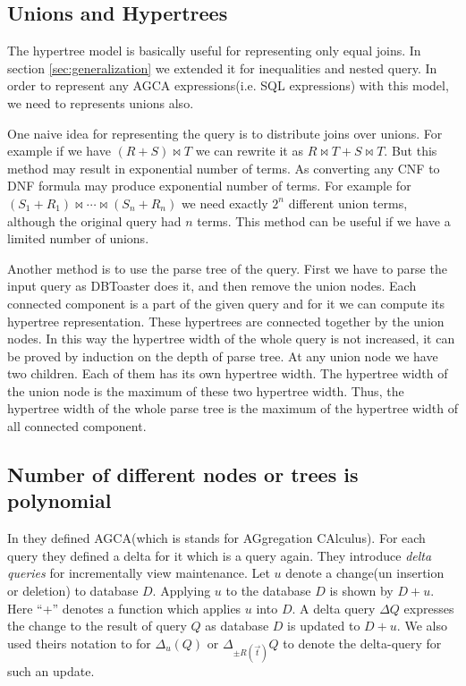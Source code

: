 \documentclass[12pt]{article}
\begin{document}
\subsection{Unions and Hypertrees}
The hypertree model is basically useful for representing only equal joins. In section \ref{sec:generalization} we extended it for inequalities and nested query. In order to represent any AGCA expressions(i.e. SQL expressions) with this model, we need to represents unions also. \par
One naive idea for representing the query is to distribute joins over unions. For example if we have $(R+S)\Join T$ we can rewrite it as $R\Join T+S\Join T$. But this method may result in exponential number of terms. As converting any CNF to DNF formula may produce exponential number of terms. For example for $(S_{1}+R_{1})\Join\cdots\Join(S_{n}+R_{n})$ we need exactly $2^{n}$ different union terms, although the original query had $n$ terms. 
This method can be useful if we have a limited number of unions. \\\par
Another method is to use the parse tree of the query. First we have to parse the input query as DBToaster does it, and then remove the union nodes. Each connected component is a part of the given query and for it we can compute its hypertree representation. These hypertrees are connected together by the union nodes. In this way the hypertree width of the whole query is not increased, it can be proved  by induction on the depth of parse tree. At any union node we have two children. Each of them has its own hypertree width. The hypertree width of the union node is the maximum of these two hypertree width. Thus, the hypertree width of the whole parse tree is the maximum of the hypertree width of all connected component.
\subsection{Number of different nodes or trees is polynomial}
In \cite{2} they defined AGCA(which is stands for AGgregation CAlculus). For each query they defined a delta for it which is a query again. They introduce \emph{delta queries} for incrementally view maintenance. Let $u$ denote a change(un insertion or deletion) to database $D$. Applying $u$ to the database $D$ is shown by $D+u$. Here ``+'' denotes a function which applies $u$ into $D$. A delta query $\Delta Q$ expresses the change to the result of query $Q$ as database $D$ is updated to $D+u$. We also used theirs notation to for $\Delta_{u}(Q)$ or $\Delta_{\pm R(\vec{t})}Q$ to denote the delta-query for such an update.
\end{document}
